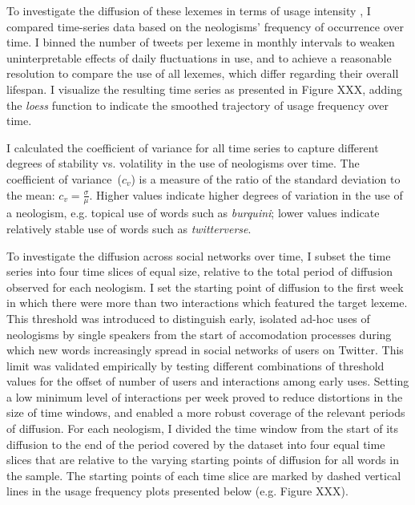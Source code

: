 \documentclass[
  a4paper,
  abstract=on,
  captions=tableabove
  ]{scrartcl}
\begin{document}
  To investigate the diffusion of these lexemes in terms of usage intensity \parencite{Stefanowitsch2017CorpusbasedPerspective}, I compared time-series data based on the neologisms' frequency of occurrence over time. I binned the number of tweets per lexeme in monthly intervals to weaken uninterpretable effects of daily fluctuations in use, and to achieve a reasonable resolution to compare the use of all lexemes, which differ regarding their overall lifespan. I visualize the resulting time series as presented in Figure XXX, adding the \emph{loess} function to indicate the smoothed trajectory of usage frequency over time.

  I calculated the coefficient of variance for all time series to capture different degrees of stability vs. volatility in the use of neologisms over time. The coefficient of variance~($c_{v}$) is a measure of the ratio of the standard deviation to the mean: $c_{v} = \frac{\sigma}{\mu}$. Higher values indicate higher degrees of variation in the use of a neologism, e.g. topical use of words such as \emph{burquini}; lower values indicate relatively stable use of words such as \emph{twitterverse}.

  To investigate the diffusion across social networks over time, I subset the time series into four time slices of equal size, relative to the total period of diffusion observed for each neologism. I set the starting point of diffusion to the first week in which there were more than two interactions which featured the target lexeme. This threshold was introduced to distinguish early, isolated ad-hoc uses of neologisms by single speakers from the start of accomodation processes during which new words increasingly spread in social networks of users on Twitter. This limit was validated empirically by testing different combinations of threshold values for the offset of number of users and interactions among early uses. Setting a low minimum level of interactions per week proved to reduce distortions in the size of time windows, and enabled a more robust coverage of the relevant periods of diffusion. For each neologism, I divided the time window from the start of its diffusion to the end of the period covered by the dataset into four equal time slices that are relative to the varying starting points of diffusion for all words in the sample. The starting points of each time slice are marked by dashed vertical lines in the usage frequency plots presented below (e.g. Figure XXX).
\end{document}
